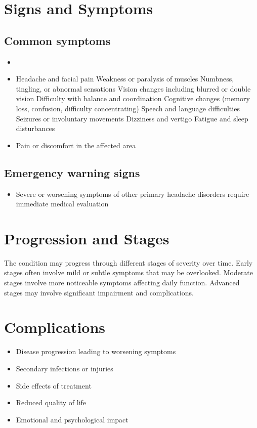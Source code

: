 \section{Signs and Symptoms}
\subsection{Common symptoms}
\begin{itemize}[noitemsep]
  \item \item Headache and facial pain Weakness or paralysis of muscles Numbness, tingling, or abnormal sensations Vision changes including blurred or double vision Difficulty with balance and coordination Cognitive changes (memory loss, confusion, difficulty concentrating) Speech and language difficulties Seizures or involuntary movements Dizziness and vertigo Fatigue and sleep disturbances
  \item Pain or discomfort in the affected area
  \end{itemize}
\subsection{Emergency warning signs}
\begin{itemize}[noitemsep]
  \item Severe or worsening symptoms of other primary headache disorders require immediate medical evaluation
\end{itemize}
\section{Progression and Stages}
The condition may progress through different stages of severity over time. Early stages often involve mild or subtle symptoms that may be overlooked. Moderate stages involve more noticeable symptoms affecting daily function. Advanced stages may involve significant impairment and complications.
\section{Complications}
\begin{itemize}[noitemsep]
  \item Disease progression leading to worsening symptoms
  \item Secondary infections or injuries
  \item Side effects of treatment
  \item Reduced quality of life
  \item Emotional and psychological impact
\end{itemize}
